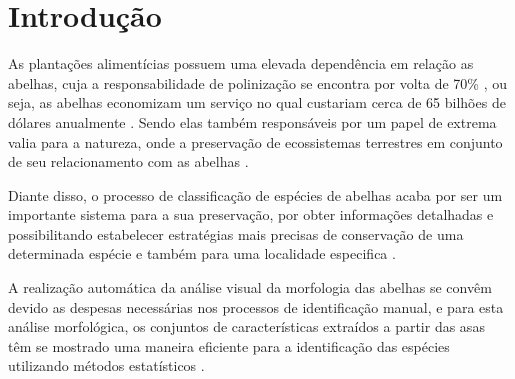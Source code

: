 \documentclass[
	12pt,				%
	oneside,			%
	a4paper,			%
	english,			%
	brazil				%
	]{abntex2ppgsi}
\begin{document}
\tableofcontents*
\cleardoublepage



\textual



% 
%
%

\chapter{Introdução}
As plantações alimentícias possuem uma elevada dependência em relação as abelhas, cuja a responsabilidade de polinização se encontra por volta de 70\% \cite{drauschke2007reliable}, ou seja, as abelhas economizam um serviço no qual custariam cerca de 65 bilhões de dólares anualmente \cite{pimentel1997economic}. Sendo elas também responsáveis por um papel de extrema valia para a natureza, onde a preservação de ecossistemas terrestres em conjunto de seu relacionamento com as abelhas \cite{lawton1998daily}. 

Diante disso, o processo de classificação de espécies de abelhas acaba por ser um importante sistema para a sua preservação, por obter informações detalhadas e possibilitando estabelecer estratégias mais precisas de conservação de uma determinada espécie e também para uma localidade especifica \cite{goulson2015bee}. 

A realização automática da análise visual da morfologia das abelhas se convêm devido as despesas necessárias nos processos de identificação manual, e para esta análise morfológica, os conjuntos de características extraídos a partir das asas têm se mostrado uma maneira eficiente para a identificação das espécies utilizando métodos estatísticos \cite{francoy2008identification}.
\end{document}
